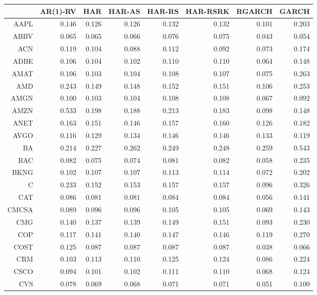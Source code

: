 \begin{table}[ht]
\centering
\begin{tabular}{rrrrrrrr}
  \hline
 & AR(1)-RV & HAR & HAR-AS & HAR-RS & HAR-RSRK & RGARCH & GARCH \\ 
  \hline
AAPL & 0.146 & 0.126 & 0.126 & 0.132 & 0.132 & 0.101 & 0.203 \\ 
  ABBV & 0.065 & 0.065 & 0.066 & 0.076 & 0.075 & 0.043 & 0.054 \\ 
  ACN & 0.119 & 0.104 & 0.088 & 0.112 & 0.092 & 0.073 & 0.174 \\ 
  ADBE & 0.106 & 0.104 & 0.102 & 0.110 & 0.110 & 0.064 & 0.148 \\ 
  AMAT & 0.106 & 0.103 & 0.104 & 0.108 & 0.107 & 0.075 & 0.263 \\ 
  AMD & 0.243 & 0.149 & 0.148 & 0.152 & 0.151 & 0.106 & 0.253 \\ 
  AMGN & 0.100 & 0.103 & 0.104 & 0.108 & 0.108 & 0.067 & 0.092 \\ 
  AMZN & 0.533 & 0.198 & 0.188 & 0.213 & 0.183 & 0.098 & 0.148 \\ 
  ANET & 0.163 & 0.151 & 0.146 & 0.157 & 0.160 & 0.126 & 0.182 \\ 
  AVGO & 0.116 & 0.129 & 0.134 & 0.146 & 0.146 & 0.133 & 0.119 \\ 
  BA & 0.214 & 0.227 & 0.262 & 0.249 & 0.248 & 0.259 & 0.543 \\ 
  BAC & 0.082 & 0.075 & 0.074 & 0.081 & 0.082 & 0.058 & 0.235 \\ 
  BKNG & 0.102 & 0.107 & 0.107 & 0.113 & 0.114 & 0.072 & 0.202 \\ 
  C & 0.233 & 0.152 & 0.153 & 0.157 & 0.157 & 0.096 & 0.326 \\ 
  CAT & 0.086 & 0.081 & 0.081 & 0.084 & 0.084 & 0.056 & 0.141 \\ 
  CMCSA & 0.089 & 0.096 & 0.096 & 0.105 & 0.105 & 0.069 & 0.143 \\ 
  CMG & 0.140 & 0.137 & 0.139 & 0.149 & 0.151 & 0.093 & 0.230 \\ 
  COP & 0.117 & 0.141 & 0.140 & 0.147 & 0.146 & 0.119 & 0.270 \\ 
  COST & 0.125 & 0.087 & 0.087 & 0.087 & 0.087 & 0.038 & 0.066 \\ 
  CRM & 0.103 & 0.113 & 0.110 & 0.125 & 0.124 & 0.086 & 0.224 \\ 
  CSCO & 0.094 & 0.101 & 0.102 & 0.111 & 0.110 & 0.068 & 0.124 \\ 
  CVS & 0.078 & 0.069 & 0.068 & 0.071 & 0.071 & 0.051 & 0.100 \\ 

\end{tabular}
\end{table}
